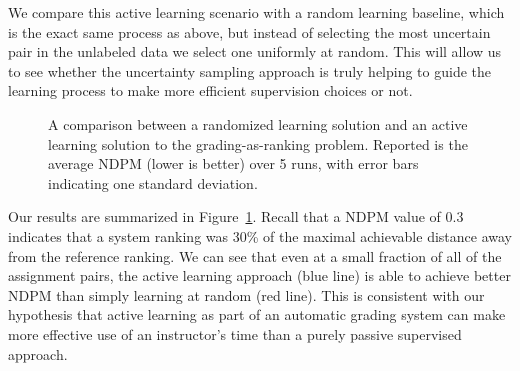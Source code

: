 We compare this active learning scenario with a random learning baseline,
which is the exact same process as above, but instead of selecting the most
uncertain pair in the unlabeled data we select one uniformly at random.
This will allow us to see whether the uncertainty sampling approach is
truly helping to guide the learning process to make more efficient
supervision choices or not.

\begin{figure}
  \begin{center}
  \caption{A comparison between a randomized learning solution and an
  active learning solution to the grading-as-ranking problem. Reported is
  the average NDPM (lower is better) over 5 runs, with error bars indicating
  one standard deviation.}
  \label{fig:active-learning}
  \end{center}
\end{figure}

Our results are summarized in Figure~\ref{fig:active-learning}. Recall that
a NDPM value of $0.3$ indicates that a system ranking was 30\% of the
maximal achievable distance away from the reference ranking. We can see
that even at a small fraction of all of the assignment pairs, the active
learning approach (blue line) is able to achieve better NDPM than simply
learning at random (red line). This is consistent with our hypothesis that
active learning as part of an automatic grading system can make more
effective use of an instructor's time than a purely passive supervised
approach.

